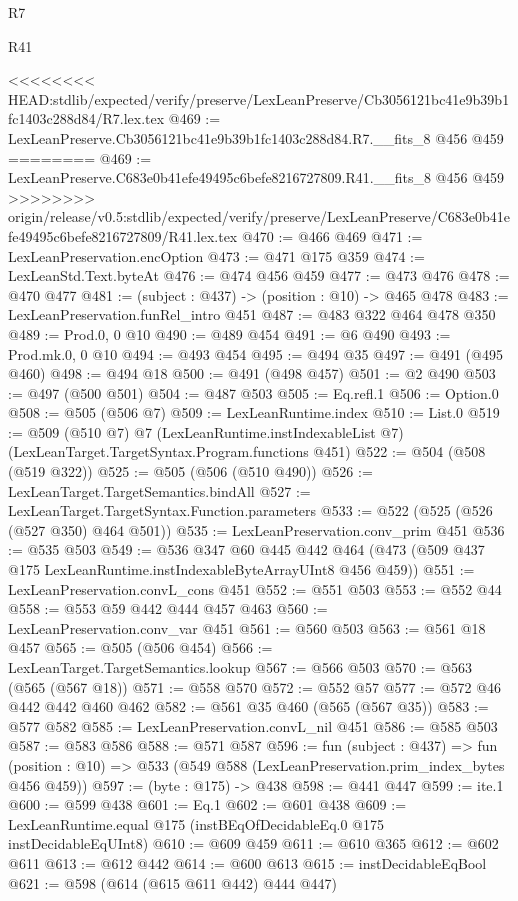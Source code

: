 \begin{lexlean}{R7}
\begin{lexlean}{R41}
\begin{coremodule}
{{{{{{{{{{{{{{{{{{{{{<<<<<<<< HEAD:stdlib/expected/verify/preserve/LexLeanPreserve/Cb3056121bc41e9b39b1fc1403c288d84/R7.lex.tex
@469 := LexLeanPreserve.Cb3056121bc41e9b39b1fc1403c288d84.R7.__fits_8 @456 @459
========
@469 := LexLeanPreserve.C683e0b41efe49495c6befe8216727809.R41.__fits_8 @456 @459
>>>>>>>> origin/release/v0.5:stdlib/expected/verify/preserve/LexLeanPreserve/C683e0b41efe49495c6befe8216727809/R41.lex.tex
@470 := @466 @469
@471 := LexLeanPreservation.encOption
@473 := @471 @175 @359
@474 := LexLeanStd.Text.byteAt
@476 := @474 @456 @459
@477 := @473 @476
@478 := @470 @477
@481 := (subject : @437) -> (position : @10) -> @465 @478
@483 := LexLeanPreservation.funRel_intro @451
@487 := @483 @322 @464 @478 @350
@489 := Prod.{0, 0} @10
@490 := @489 @454
@491 := @6 @490
@493 := Prod.mk.{0, 0} @10
@494 := @493 @454
@495 := @494 @35
@497 := @491 (@495 @460)
@498 := @494 @18
@500 := @491 (@498 @457)
@501 := @2 @490
@503 := @497 (@500 @501)
@504 := @487 @503
@505 := Eq.refl.{1}
@506 := Option.{0}
@508 := @505 (@506 @7)
@509 := LexLeanRuntime.index
@510 := List.{0}
@519 := @509
    (@510 @7)
    @7
    (LexLeanRuntime.instIndexableList @7)
    (LexLeanTarget.TargetSyntax.Program.functions @451)
@522 := @504 (@508 (@519 @322))
@525 := @505 (@506 (@510 @490))
@526 := LexLeanTarget.TargetSemantics.bindAll
@527 := LexLeanTarget.TargetSyntax.Function.parameters
@533 := @522 (@525 (@526 (@527 @350) @464 @501))
@535 := LexLeanPreservation.conv_prim @451
@536 := @535 @503
@549 := @536
    @347
    @60
    @445
    @442
    @464
    (@473 (@509 @437 @175 LexLeanRuntime.instIndexableByteArrayUInt8 @456 @459))
@551 := LexLeanPreservation.convL_cons @451
@552 := @551 @503
@553 := @552 @44
@558 := @553 @59 @442 @444 @457 @463
@560 := LexLeanPreservation.conv_var @451
@561 := @560 @503
@563 := @561 @18 @457
@565 := @505 (@506 @454)
@566 := LexLeanTarget.TargetSemantics.lookup
@567 := @566 @503
@570 := @563 (@565 (@567 @18))
@571 := @558 @570
@572 := @552 @57
@577 := @572 @46 @442 @442 @460 @462
@582 := @561 @35 @460 (@565 (@567 @35))
@583 := @577 @582
@585 := LexLeanPreservation.convL_nil @451
@586 := @585 @503
@587 := @583 @586
@588 := @571 @587
@596 := fun (subject : @437) =>
  fun (position : @10) => @533 (@549 @588 (LexLeanPreservation.prim_index_bytes @456 @459))
@597 := (byte : @175) -> @438
@598 := @441 @447
@599 := ite.{1}
@600 := @599 @438
@601 := Eq.{1}
@602 := @601 @438
@609 := LexLeanRuntime.equal @175 (instBEqOfDecidableEq.{0} @175 instDecidableEqUInt8)
@610 := @609 @459
@611 := @610 @365
@612 := @602 @611
@613 := @612 @442
@614 := @600 @613
@615 := instDecidableEqBool
@621 := @598 (@614 (@615 @611 @442) @444 @447)
}}}}}}}}}}}}}}}}}}}}}
\end{coremodule}
\end{lexlean}
\end{lexlean}
